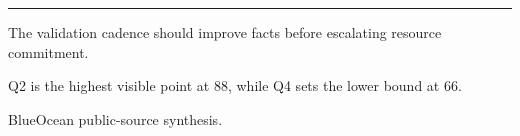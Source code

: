 \documentclass[10pt,a4paper]{article}
\begin{document}
\vspace{3pt}\noindent\begin{minipage}[t]{0.58\linewidth}
\textcolor{BOGreen}{\rule{24mm}{0.6pt}}\par\vspace{3pt}
{\footnotesize\color{BOText} The validation cadence should improve facts before escalating resource commitment.}\par\vspace{2pt}
{\footnotesize\color{BOText} Q2 is the highest visible point at 88, while Q4 sets the lower bound at 66.}\par\vspace{2pt}
\end{minipage}\hfill\begin{minipage}[t]{0.36\linewidth}
\par
\end{minipage}\par\vspace{2pt}
\par
{\scriptsize\color{BOMuted} BlueOcean public-source synthesis.}\par
\end{document}

